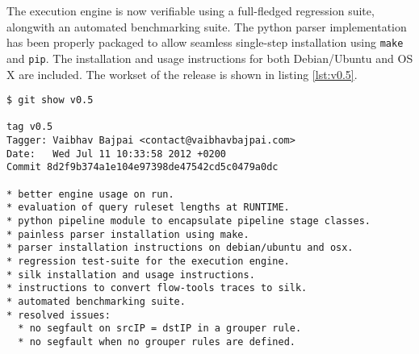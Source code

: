 The execution engine is now verifiable using a full-fledged regression suite,
alongwith an automated benchmarking suite. The python parser  implementation has been properly packaged to allow seamless
single-step installation using \texttt{make} and \texttt{pip}. The
installation and usage instructions for both Debian/Ubuntu and OS X are
included.  The workset of the release is shown in listing \ref{lst:v0.5}.

\begin{lstlisting}
$ git show v0.5

tag v0.5
Tagger: Vaibhav Bajpai <contact@vaibhavbajpai.com>
Date:   Wed Jul 11 10:33:58 2012 +0200
Commit 8d2f9b374a1e104e97398de47542cd5c0479a0dc

* better engine usage on run.
* evaluation of query ruleset lengths at RUNTIME.
* python pipeline module to encapsulate pipeline stage classes.
* painless parser installation using make.
* parser installation instructions on debian/ubuntu and osx.
* regression test-suite for the execution engine.
* silk installation and usage instructions.
* instructions to convert flow-tools traces to silk.
* automated benchmarking suite.
* resolved issues:
  * no segfault on srcIP = dstIP in a grouper rule.
  * no segfault when no grouper rules are defined.
\end{lstlisting}
